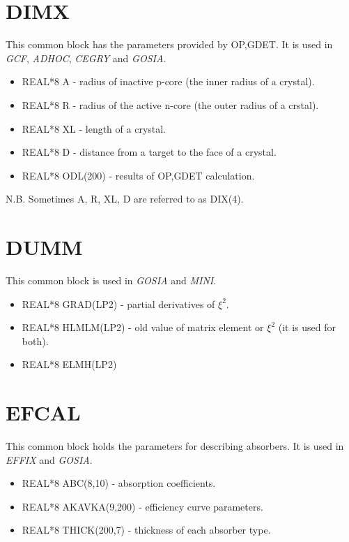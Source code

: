 \section{DIMX}

This common block has the parameters provided by OP,GDET. It is used in \emph{
GCF}, \emph{ADHOC}, \emph{CEGRY} and \emph{GOSIA}.

\begin{itemize}
\item REAL*8 A - radius of inactive p-core (the inner radius of a crystal).
\item REAL*8 R - radius of the active n-core (the outer radius of a crstal).
\item REAL*8 XL - length of a crystal.
\item REAL*8 D - distance from a target to the face of a crystal.
\item REAL*8 ODL(200) - results of OP,GDET calculation.
\end{itemize}

N.B. Sometimes A, R, XL, D are referred to as DIX(4).

\section{DUMM}

This common block is used in \emph{GOSIA} and \emph{MINI}.

\begin{itemize}
\item REAL*8 GRAD(LP2) - partial derivatives of $\xi^2$.
\item REAL*8 HLMLM(LP2) - old value of matrix element or $\xi^2$ (it is used
for both).
\item REAL*8 ELMH(LP2)
\end{itemize}

\section{EFCAL}

This common block holds the parameters for describing absorbers. It is used
in \emph{EFFIX} and \emph{GOSIA}.

\begin{itemize}
\item REAL*8 ABC(8,10) - absorption coefficients.
\item REAL*8 AKAVKA(9,200) - efficiency curve parameters.
\item REAL*8 THICK(200,7) - thickness of each absorber type.
\end{itemize}

